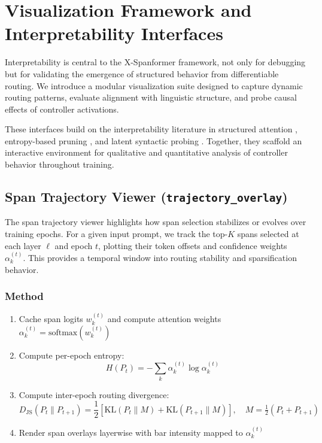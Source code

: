 \section{Visualization Framework and Interpretability Interfaces}
\label{sec:visualizations}

Interpretability is central to the X-Spanformer framework, not only for debugging but for validating the emergence of structured behavior from differentiable routing. We introduce a modular visualization suite designed to capture dynamic routing patterns, evaluate alignment with linguistic structure, and probe causal effects of controller activations.

These interfaces build on the interpretability literature in structured attention \cite{vig2019analyzing, hoover2020exbert}, entropy-based pruning \cite{grandvalet2006entropy, pereyra2017regularizing}, and latent syntactic probing \cite{linzen2016assessing, kim2019unsupervised}. Together, they scaffold an interactive environment for qualitative and quantitative analysis of controller behavior throughout training.










\subsection{Span Trajectory Viewer (\texttt{trajectory\_overlay})}
\label{sec:vis-traj}

The span trajectory viewer highlights how span selection stabilizes or evolves over training epochs. For a given input prompt, we track the top-$K$ spans selected at each layer \( \ell \) and epoch \( t \), plotting their token offsets and confidence weights \( \alpha_k^{(t)} \). This provides a temporal window into routing stability and sparsification behavior.

\subsubsection*{Method}

\begin{enumerate}[leftmargin=1.5em]
  \item Cache span logits \( w_k^{(t)} \) and compute attention weights \( \alpha_k^{(t)} = \mathrm{softmax}(w_k^{(t)}) \)
  \item Compute per-epoch entropy:
  \begin{equation}
    H(P_t) = - \sum_k \alpha_k^{(t)} \log \alpha_k^{(t)}
    \label{eq:entropy_viz}
  \end{equation}
  \item Compute inter-epoch routing divergence:
  \begin{equation}
    D_{\mathrm{JS}}(P_t \| P_{t+1}) = \frac{1}{2} \left[ \mathrm{KL}(P_t \| M) + \mathrm{KL}(P_{t+1} \| M) \right], \quad M = \tfrac{1}{2}(P_t + P_{t+1})
    \label{eq:jsdiv}
  \end{equation}
  \item Render span overlays layerwise with bar intensity mapped to \( \alpha_k^{(t)} \)
\end{enumerate}

